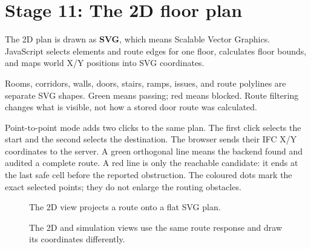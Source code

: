 \documentclass[11pt,a4paper]{article}
\newcommand{\term}[1]{\textbf{#1}}
\newcommand{\door}[2]{\fill[green] (#1-0.16,#2-0.32) rectangle (#1+0.16,#2+0.32);}
\begin{document}
\section{Stage 11: The 2D floor plan}
The 2D plan is drawn as \term{SVG}, which means Scalable Vector Graphics. JavaScript selects elements and route edges for one floor, calculates floor bounds, and maps world X/Y positions into SVG coordinates.

Rooms, corridors, walls, doors, stairs, ramps, issues, and route polylines are separate SVG shapes. Green means passing; red means blocked. Route filtering changes what is visible, not how a stored door route was calculated.

Point-to-point mode adds two clicks to the same plan. The first click selects the start and the second selects the destination. The browser sends their IFC X/Y coordinates to the server. A green orthogonal line means the backend found and audited a complete route. A red line is only the reachable candidate: it ends at the last safe cell before the reported obstruction. The coloured dots mark the exact selected points; they do not enlarge the routing obstacles.

\begin{figure}[H]\centering
{}
\caption{The 2D view projects a route onto a flat SVG plan.}
\end{figure}

\begin{figure}[H]\centering
{}
\caption{The 2D and simulation views use the same route response and draw its coordinates differently.}
\end{figure}
\end{document}
